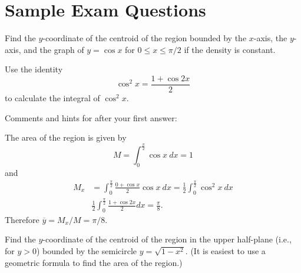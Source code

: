 \documentclass{ximera}
\begin{document}
\section*{Sample Exam Questions}




\begin{question}%

Find the \(y\)-coordinate of the centroid of the region bounded by the \(x\)-axis, the \(y\)-axis, and the graph of \(y = \cos x\) for \(0 \leq x \leq \pi/2\) if the density is constant.
\begin{hint}
Use the identity \[ \cos^2 x  = \frac{1 + \cos 2x}{2} \]
to calculate the integral of $\cos^2 x$.
\end{hint}
\begin{multiplechoice}
\end{multiplechoice}
Comments and hints for after your first answer:
\begin{feedback}
The area of the region is given by
\[ M = \int_0^{\frac{\pi}{2}} \cos x~dx = 1 \]
and 
\[\begin{aligned}
 M_x & = \int_0^{\frac{\pi}{2}} \frac{0 + \cos x}{2} \cos x~ dx = \frac{1}{2} \int_0^{\frac{\pi}{2}} \cos^2 x ~ dx \\
& \frac{1}{2} \int_0^{\frac{\pi}{2}} \frac{1 + \cos 2x}{2} dx = \frac{\pi}{8}. 
\end{aligned}\]
Therefore \(\overline{y} = M_x / M = \pi/8\).
\end{feedback}

\end{question}

\begin{question}%

Find the \(y\)-coordinate of the centroid of the region in the upper half-plane (i.e., for \(y > 0\)) bounded by the semicircle \(y = \sqrt{1-x^2}\). (It is easiest to use a geometric formula to find the area of the region.)
\begin{multiplechoice}
\end{multiplechoice}

\end{question}
\end{document}
